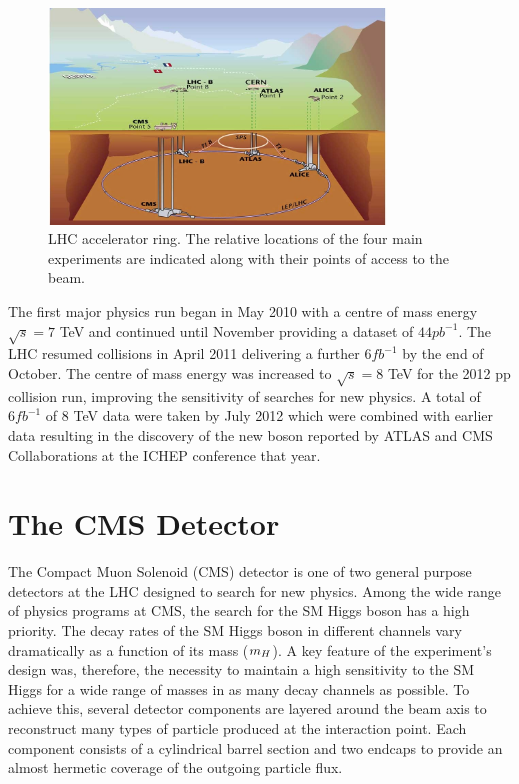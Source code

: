 \begin{figure}[htb!]
\begin{center}
\includegraphics[width=0.8\textwidth]{detector/CERN.jpg}
\caption{LHC accelerator ring. The relative locations of the four main experiments 
are indicated along with their points of access to the beam.}
\label{fig:lhcring}
\end{center}
\end{figure}

The first major physics run began in May 2010 with a centre of mass energy 
$\sqrt{s}=7$ TeV and continued until November providing a dataset of $44pb^{-1}$.
The LHC resumed collisions in April 2011 delivering a further $6fb^{-1}$ by the end
of October. The centre of mass energy was increased to $\sqrt{s}=8$ TeV for the 2012 pp 
collision run, improving the sensitivity of searches for new physics. A total of
$6fb^{-1}$ of 8 TeV data were taken by July 2012 which were combined with earlier data resulting
in the discovery of the new boson reported by ATLAS and CMS Collaborations at the ICHEP conference that year. 

\section{The CMS Detector}
\label{sec:cmsdetector}
The Compact Muon Solenoid (CMS) detector is one of two general purpose detectors at 
the LHC designed to search for new physics. 
Among the wide range of physics programs at CMS, the search for the SM Higgs boson 
has a high priority. The decay rates of the SM Higgs boson in different 
channels vary dramatically as a function of its mass ($m_{H}$). A key feature of the experiment's design
was, therefore, the necessity to maintain a high sensitivity to the SM Higgs for a wide range of masses in as many 
decay channels as possible. To achieve this, several detector components are layered around 
the beam axis to reconstruct many types of particle produced at the interaction point.
Each component consists of a cylindrical barrel section and two endcaps 
to provide an almost hermetic coverage of the outgoing particle flux.


